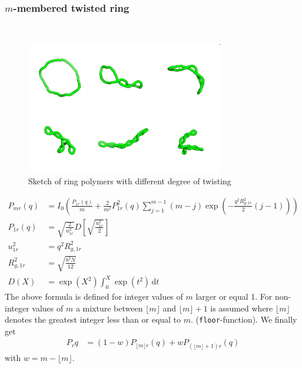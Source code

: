 
\clearpage
\subsubsection{$m$-membered twisted ring }
\label{sect:mMemberedTwistedRing}
~\\
\cite{Burchard1996}
\begin{figure}[htb]
\begin{center}
\includegraphics[width=0.768\textwidth,height=0.516\textwidth]{TWsnap.png}
\end{center}
\caption{Sketch of ring polymers with different degree of twisting}
\label{fig:mMemberedTwistedRing}
\end{figure}

\begin{align}
P_{mr}(q) & = I_0\left(\frac{P_{1r}(q)}{m} + \frac{2}{m^2}P_{1r}^2(q)\sum_{j=1}^{m-1}(m-j)\exp\left(-\frac{q^2R^2_{g,1r}}{2}(j-1)\right)\right) \\
P_{1r}(q) & = \sqrt{\frac{2}{u_{1r}^2}} D\left[ \sqrt{\frac{u_{1r}^2}{2}} \right] \\
u_{1r}^2 &= q^2R^2_{g,1r} \\
R^2_{g,1r} &= \sqrt{\frac{b^2N}{12}} \\
D(X) &= \exp\left(X^2\right) \int_0^X \exp(t^2)\, \mathrm{d}t
\end{align}
The above formula is defined for integer values of $m$ larger or equal 1. For non-integer values of $m$ a mixture between $\lfloor m\rfloor$ and $\lfloor m\rfloor+1$ is assumed where $\lfloor m \rfloor$ denotes the greatest integer less than or equal to $m$. (\texttt{\texttt{floor}}-function). We finally get
\begin{align}
P_r{q} &= (1-w)P_{\lfloor m\rfloor r}(q) + w P_{(\lfloor m\rfloor+1) r}(q)
\end{align}
with $w=m-\lfloor m\rfloor$.

